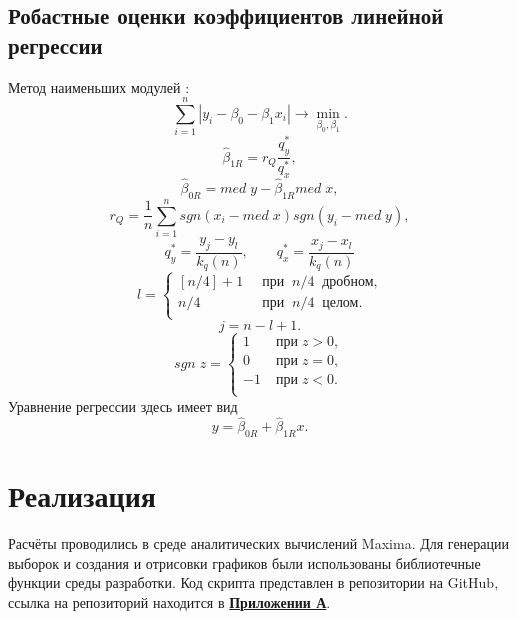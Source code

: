 \documentclass[12pt]{article}
\begin{document}
\subsection{Робастные оценки коэффициентов линейной регрессии}
Метод наименьших модулей \cite{theory}:
\begin{equation}
    \sum_{i = 1}^{n}|y_i - \beta_0 - \beta_1x_i| \rightarrow \min_{\beta_0, \beta_1}.
\end{equation}
\begin{equation}
    \hat{\beta}_{1R} = r_Q\frac{q^{*}_{y}}{q^{*}_{x}},
    \label{mnm1}
\end{equation}
\begin{equation}
    \hat{\beta}_{0R} = med \; y - \hat{\beta}_{1R} med \; x,
    \label{mnm0}
\end{equation}
\begin{equation}
    r_Q = \frac{1}{n}\sum_{i=1}^{n}sgn(x_i - med \; x)sgn(y_i - med \; y),
\end{equation}
\begin{equation}
    q^{*}_{y} = \frac{y_j - y_l}{k_q(n)}, \qquad q^{*}_{x} = \frac{x_j - x_l}{k_q(n)}
\end{equation}
\[
    l = 
		\left\{
		\begin{aligned}
			 \left[n/4\right] + 1& \;\; \text{при} \;\; n/4 \;\; \text{дробном,}\\
			 n/4                  & \;\; \text{при} \;\; n/4 \;\; \text{целом.}\\
		\end{aligned}
		\right.
\]
\[
    j = n - l + 1.
\]
\[
    sgn \; z = 
		\left\{
		\begin{aligned}
			 1 & \; \text{при} \; z > 0,\\
             0 & \; \text{при} \; z = 0,\\
             -1 & \; \text{при} \; z < 0.\\
		\end{aligned}
		\right.
\]
Уравнение регрессии здесь имеет вид
\begin{equation}
    y = \hat{\beta}_{0R} + \hat{\beta}_{1R}x.
\end{equation}

\newpage
\section{Реализация}
Расчёты проводились в среде аналитических вычислений Maxima. Для генерации выборок и создания и отрисовки графиков были использованы библиотечные функции среды разработки. Код скрипта представлен в репозитории на GitHub, ссылка на репозиторий находится в \hyperlink{addition}{\textbf{Приложении А}}.
\end{document}
